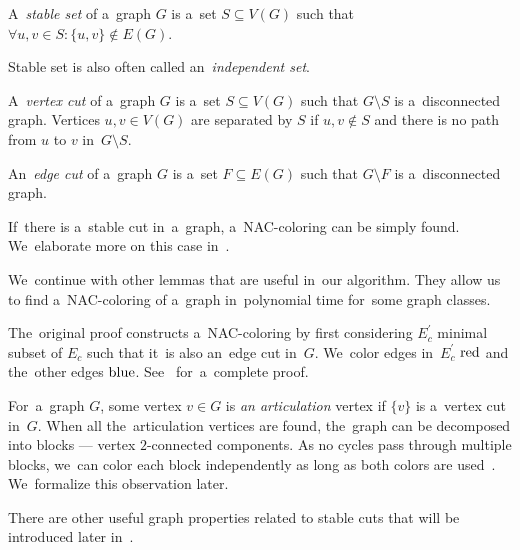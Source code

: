 %
\begin{definition}
	A~\emph{stable set} of a~graph \( G \) is a~set \( S \subseteq V(G) \) such that
	\( \forall u, v \in S : \{u, v\} \not\in E(G) \).
\end{definition}
%
Stable set is also often called an~\emph{independent set}.
%
\begin{definition}
	A~\emph{vertex cut} of a~graph \( G \) is a~set \( S \subseteq V(G) \) such that
	\( G \setminus S \) is a~disconnected graph.
	Vertices \( u, v \in V(G) \) are separated by \( S \)
	if \( u, v \not\in S \)
	and there is no path from \( u \) to \( v \) in~\( G \setminus S \).
\end{definition}
%
\begin{definition}
	An~\emph{edge cut} of a~graph \( G \) is a~set \( F \subseteq E(G) \) such that
	\( G \setminus F \) is a~disconnected graph.
\end{definition}
%
%
If~there is a~stable cut in~a~graph, a~NAC-coloring can be simply found.
We~elaborate more on this case in~.

We~continue with other lemmas that are useful in~our algorithm.
They allow us to find a~NAC-coloring of a~graph in~polynomial time for~some graph classes.
%
%
The~original proof constructs a~NAC-coloring by first considering
\( E_c^\prime \) minimal subset of \( E_c \)
such that it~is also an~edge cut in~\( G \).
We~color edges in~\( E_c^\prime \) \( \text{red} \) and the~other edges \( \text{blue} \).
See~\cite{legersky_original} for~a~complete proof.

For~a~graph \( G \), some vertex \( v \in G \) is \emph{an articulation} vertex if
\( \{v\} \) is a~vertex cut in~\( G \).
When all the~articulation vertices are found,
the~graph can be decomposed into blocks
--- vertex \( 2 \)-connected components.
As no cycles pass through multiple blocks, we~can color each block
independently as long as both colors are used~\cite{my_paper}.
We~formalize this observation later.

There are other useful graph properties related to stable cuts
that will be introduced later in~.

